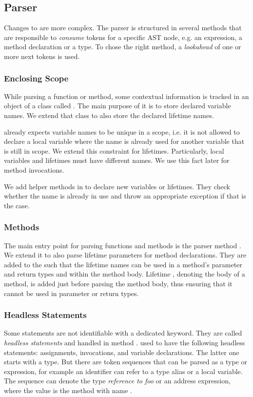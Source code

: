 \subsection{Parser}
Changes to  are more complex.
The parser is structured in several methods that are responsible to \emph{consume} tokens for a specific AST node, e.g. an expression, a method declaration or a type.
To chose the right method, a \emph{lookahead} of one or more next tokens is used.

\subsubsection{Enclosing Scope}
While parsing a function or method, some contextual information is tracked in an object of a class called .
The main purpose of it is to store declared variable names.
We extend that class to also store the declared lifetime names.

\whiley already expects variable names to be unique in a scope, i.e. it is not allowed to declare a local variable where the name is already used for another variable that is still in scope.
We extend this constraint for lifetimes.
Particularly, local variables and lifetimes must have different names.
We use this fact later for method invocations.

We add helper methods in  to declare new variables or lifetimes.
They check whether the name is already in use and throw an appropriate exception if that is the case.

\subsubsection{Methods}
The main entry point for parsing \whiley functions and methods is the parser method .
We extend it to also parse lifetime parameters for method declarations.
They are added to the  such that the lifetime names can be used in a method's parameter and return types and within the method body.
Lifetime , denoting the body of a method, is added just before parsing the method body, thus ensuring that it cannot be used in parameter or return types.

\subsubsection{Headless Statements}
Some statements are not identifiable with a dedicated keyword.
They are called \emph{headless statements} and handled in method .
\whiley used to have the following headless statements:
assignments, invocations, and variable declarations.
The latter one starts with a type.
But there are token sequences that can be parsed as a type or expression, for example an identifier can refer to a type alias or a local variable.
The sequence  can denote the type \emph{reference to foo} or an address expression, where the value is the method with name .

